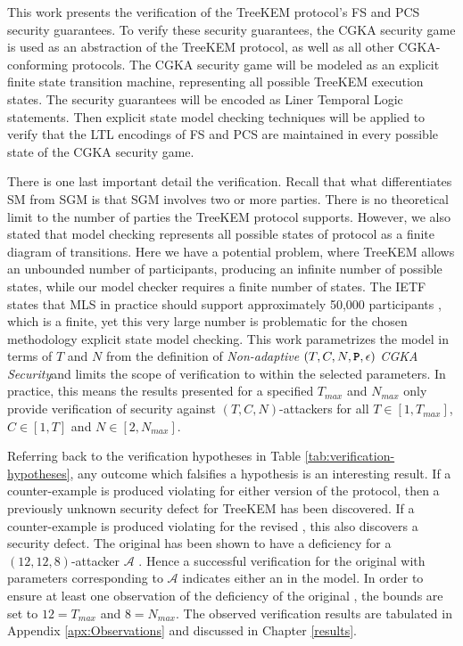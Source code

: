 This work presents the verification of the TreeKEM protocol's FS and PCS security guarantees.
To verify these security guarantees, the CGKA security game is used as an abstraction of the TreeKEM protocol, as well as all other CGKA-conforming protocols.
The CGKA security game will be modeled as an explicit finite state transition machine, representing all possible TreeKEM execution states.
The security guarantees will be encoded as Liner Temporal Logic statements.
Then explicit state model checking techniques will be applied to verify that the LTL encodings of FS and PCS are maintained in every possible state of the CGKA security game.

There is one last important detail the verification.
Recall that what differentiates SM from SGM is that SGM involves two or more parties.
There is no theoretical limit to the number of parties the TreeKEM protocol supports.
However, we also stated that model checking represents all possible states of protocol as a finite diagram of transitions.
Here we have a potential problem, where TreeKEM allows an unbounded number of participants, producing an infinite number of possible states, while our model checker requires a finite number of states.
The IETF states that MLS in practice should support approximately 50,000 participants \autocite{Omara2020}, which is a finite, yet this very large number is problematic for the chosen methodology explicit state model checking.
This work parametrizes the model in terms of \(T\) and \(N\) from the definition of \emph{Non-adaptive} \((T, C, N, \textbf{\texttt{P}}, \epsilon)\) \emph{CGKA Security}and limits the scope of verification to within the selected parameters.
In practice, this means the results presented for a specified \(T_{max}\) and \(N_{max}\) only provide verification of security against \((T, C, N)\)-attackers for all \(T \in [1, T_{max}]\), \(C \in [1, T]\) and \(N \in [2, N_{max}]\).

Referring back to the verification hypotheses in Table \ref{tab:verification-hypotheses}, any outcome which falsifies a hypothesis is an interesting result.
If a counter-example is produced violating  for either version of the protocol, then a previously unknown security defect for TreeKEM has been discovered.
If a counter-example is produced violating  for the revised \VersionTwo, this also discovers a security defect.
The original \VersionOne has been shown to have a  deficiency for a \((12, 12, 8)\)-attacker \(\mathcal{A}\) \autocite{alwen2020security}.
Hence a successful  verification for the original \VersionOne with parameters corresponding to \(\mathcal{A}\) indicates either an in the model.
In order to ensure at least one observation of the  deficiency of the original \VersionOne, the bounds are set to \(12 = T_{max}\) and \(8 = N_{max}\).
The observed verification results are tabulated in Appendix \ref{apx:Observations} and discussed in Chapter \ref{results}.


